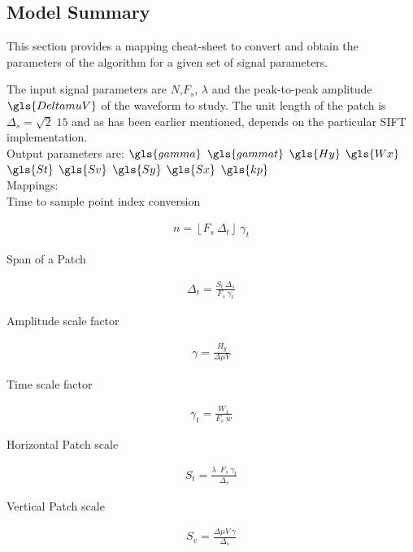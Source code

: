 \begin{subappendices}

\section{Model Summary}

This section provides a mapping cheat-sheet to convert and obtain the parameters of the algorithm for a given set of signal parameters.

The input signal parameters are $N$,$F_s$, $\lambda$ and the peak-to-peak amplitude $\gls{DeltamuV}$ of the waveform to study. The unit length of the patch is $\Delta_s = \sqrt{2} \; 15$ and as has been earlier mentioned, depends on the particular SIFT implementation.\\


Output parameters are: 
$\gls{gamma}$
$\gls{gammat}$
$\gls{Hy}$
$\gls{Wx}$
$\gls{St}$
$\gls{Sv}$
$\gls{Sy}$
$\gls{Sx}$
$\gls{kp}$\\

Mappings:\\

Time to sample point index conversion

\begin{align*}
n = \left\lfloor F_s \ \Delta_t \right\rfloor \ \gamma_t
\end{align*}

Span of a Patch

\begin{align*}
\Delta_t = \frac{S_t \ \Delta_s}{F_s \ \gamma_t} 
\end{align*}

Amplitude scale factor

\begin{align*}
\gamma = \frac{H_y}{\Delta \mu V}  
\end{align*}

Time scale factor

\begin{align*}
\gamma_t = \frac{W_x}{F_s \; w}  
\end{align*}

Horizontal Patch scale

\begin{align*}
S_t = \frac{ \lambda \;  \  F_s \ \gamma_t }{\Delta_s}
\end{align*}

Vertical Patch scale

\begin{align*}
S_v= \frac{\Delta \mu V \ \gamma}{\Delta_s} 
\end{align*}


\end{subappendices}
